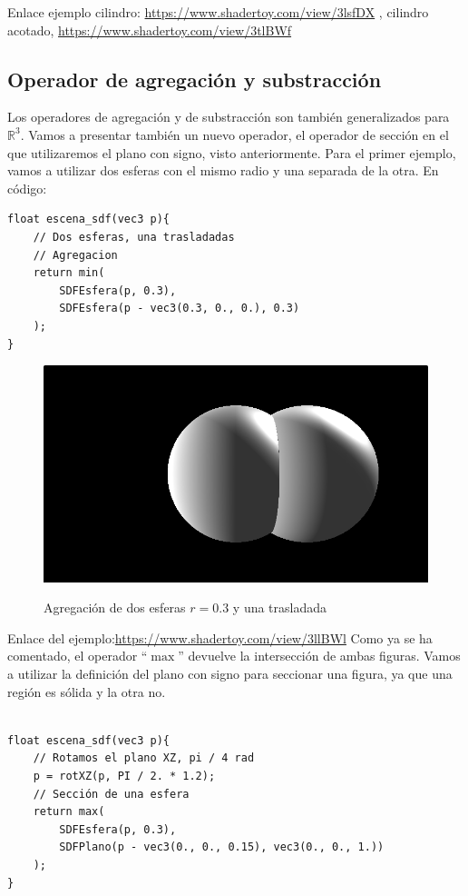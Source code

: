 Enlace ejemplo cilindro:
\url{https://www.shadertoy.com/view/3lsfDX}
, cilindro acotado,
\url{https://www.shadertoy.com/view/3tlBWf}

\subsection{Operador de agregación y substracción}
Los operadores de agregación y de substracción son también generalizados para \(\mathbb{R}^3\). Vamos a presentar también un nuevo operador, el operador de sección en el que utilizaremos el plano con signo, visto anteriormente. Para el primer ejemplo, vamos a utilizar dos esferas con el mismo radio y una separada de la otra. En código:
\begin{lstlisting}
float escena_sdf(vec3 p){
    // Dos esferas, una trasladadas
    // Agregacion
    return min(
        SDFEsfera(p, 0.3),
        SDFEsfera(p - vec3(0.3, 0., 0.), 0.3)
    );
}
\end{lstlisting}
\begin{figure}[H]
  \centering
  \captionsetup{justification=centering}%
  \includegraphics[width=1.0\textwidth]{secciones/imagenes/sdf/3d/sdf_add_3d.png}\label{fig:add3d}
  \caption{Agregación de dos esferas \(r=0.3\) y una trasladada}
\end{figure}

Enlace del ejemplo:\url{https://www.shadertoy.com/view/3llBWl}
Como ya se ha comentado, el operador \enquote{\(\max\)} devuelve la intersección de ambas figuras. Vamos a utilizar la definición del plano con signo para seccionar una figura, ya que una región es sólida y la otra no. \\\\

\begin{lstlisting}
float escena_sdf(vec3 p){
    // Rotamos el plano XZ, pi / 4 rad
    p = rotXZ(p, PI / 2. * 1.2);
	// Sección de una esfera
    return max(
        SDFEsfera(p, 0.3),
        SDFPlano(p - vec3(0., 0., 0.15), vec3(0., 0., 1.))
    );
}
\end{lstlisting}

